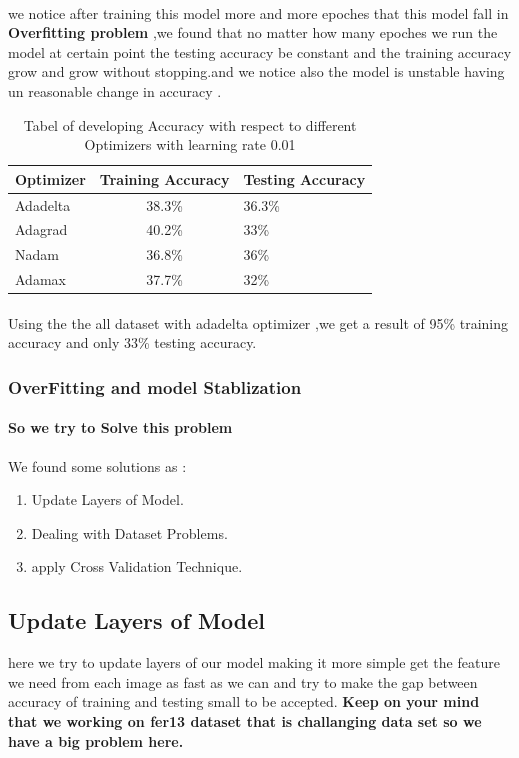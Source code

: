 \paragraph{}
we notice after training this model more and more epoches that this model fall in \textbf{Overfitting problem} ,we found that no matter how many epoches we run the model at certain point the testing accuracy be constant and the training accuracy grow and grow without stopping.and we notice also the model is unstable having un reasonable change in accuracy . 
\begin{table}[h!]
	\begin{center}
		\caption{Tabel of developing Accuracy with respect to different Optimizers with learning rate 0.01 \newline}
		\label{tab:optimizers}
		\begin{tabular}{l|c|l}
			\textbf{Optimizer} & \textbf{Training Accuracy} & \textbf{Testing Accuracy}\\ 
			\hline 
			Adadelta & 38.3\% & 36.3\% \\
			Adagrad & 40.2\% & 33\%\\
			Nadam & 36.8\% & 36\% \\
			Adamax & 37.7\% & 32\% \\
		\end{tabular}
	\end{center}
\end{table}
\paragraph{}
Using the the all dataset with adadelta optimizer ,we get a result of 95\% training accuracy and only 33\% testing accuracy.
\subsubsection{OverFitting and model Stablization}
\paragraph{So we try to Solve this problem }
We found some solutions as :
\begin{enumerate}
	\item Update Layers of Model.
	\item Dealing with Dataset Problems.
	\item apply Cross Validation Technique.
\end{enumerate}
\subsection{Update Layers of Model}
here we try to update layers of our model making it more simple get the feature we need from each image as fast as we can and try to make the gap between accuracy of training and testing small to be accepted.
\textbf{Keep on your mind that we working on fer13 dataset that is challanging data set so we have a big problem here.}
